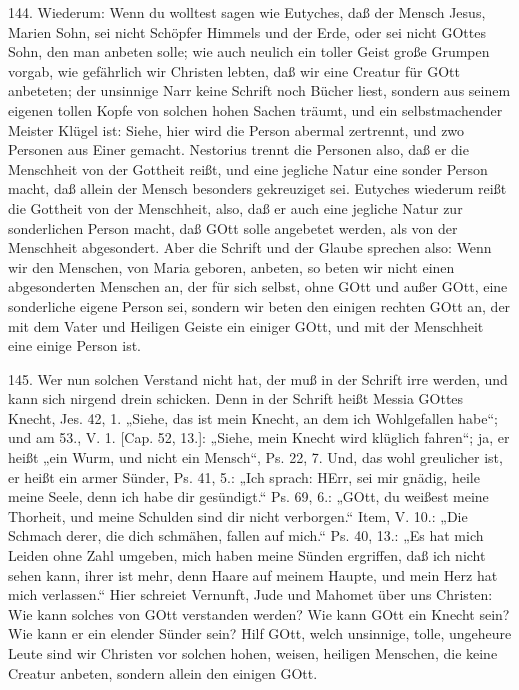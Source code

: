 144. Wiederum: Wenn du wolltest sagen wie Eutyches, daß der Mensch Jesus, Marien
Sohn, sei nicht Schöpfer Himmels und der Erde, oder sei nicht GOttes Sohn, den man anbeten solle; wie auch neulich ein toller Geist große Grumpen vorgab, wie gefährlich wir Christen lebten, daß wir eine Creatur für GOtt anbeteten; der unsinnige Narr keine Schrift noch Bücher liest, sondern aus seinem eigenen tollen Kopfe von solchen hohen Sachen träumt, und ein selbstmachender Meister Klügel ist: Siehe, hier wird die Person abermal zertrennt, und zwo Personen aus Einer gemacht. Nestorius trennt die Personen also, daß er die Menschheit von der Gottheit reißt, und eine jegliche Natur eine sonder Person macht, daß allein der Mensch besonders gekreuziget sei. Eutyches wiederum reißt die Gottheit von der Menschheit, also, daß er auch eine jegliche Natur zur sonderlichen Person macht, daß GOtt solle angebetet werden, als von der Menschheit abgesondert. Aber die Schrift und der Glaube sprechen also: Wenn wir den Menschen, von Maria geboren, anbeten, so beten wir nicht einen abgesonderten Menschen an, der für sich selbst, ohne GOtt und außer GOtt, eine sonderliche eigene Person sei, sondern wir beten den einigen rechten GOtt an, der mit dem Vater und Heiligen Geiste ein einiger GOtt, und mit der Menschheit eine einige Person ist.

145. Wer nun solchen Verstand nicht hat, der muß in der Schrift irre werden, und kann sich nirgend drein schicken. Denn in der Schrift heißt Messia GOttes Knecht, Jes. 42, 1. „Siehe, das ist mein Knecht, an dem ich Wohlgefallen habe“; und am 53., V. 1. [Cap. 52, 13.]: „Siehe, mein Knecht wird klüglich fahren“; ja, er heißt „ein Wurm, und nicht ein Mensch“, Ps. 22, 7. Und, das wohl greulicher ist, er heißt ein armer Sünder, Ps. 41, 5.: „Ich sprach: HErr, sei mir gnädig, heile meine Seele, denn ich habe dir gesündigt.“ Ps. 69, 6.: „GOtt, du weißest meine Thorheit, und meine Schulden sind dir nicht verborgen.“ Item, V. 10.: „Die Schmach derer, die dich schmähen, fallen auf mich.“ Ps. 40, 13.: „Es hat mich Leiden ohne Zahl umgeben, mich haben meine Sünden ergriffen, daß ich nicht sehen kann, ihrer ist mehr, denn Haare auf meinem Haupte, und mein Herz hat mich verlassen.“ Hier schreiet Vernunft, Jude und Mahomet über uns Christen: Wie kann solches von GOtt verstanden werden? Wie kann GOtt ein Knecht sein? Wie kann er ein elender Sünder sein? Hilf GOtt, welch unsinnige, tolle, ungeheure Leute sind wir Christen vor solchen hohen, weisen, heiligen Menschen, die keine Creatur anbeten, sondern allein den einigen GOtt.

